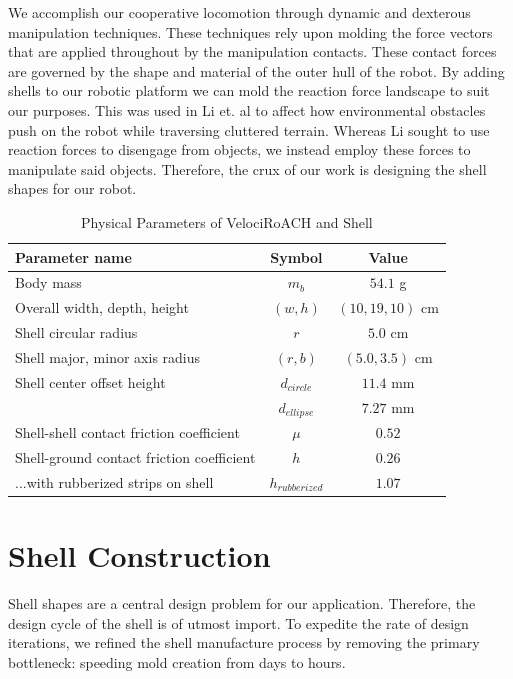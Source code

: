 \documentclass[letterpaper]{report}
\begin{document}
We accomplish our cooperative locomotion through dynamic and dexterous manipulation techniques.
These techniques rely upon molding the force vectors that are applied throughout by the manipulation contacts.
These contact forces are governed by the shape and material of the outer hull of the robot.
By adding shells to our robotic platform we can mold the reaction force landscape to suit our purposes.
This was used in Li et. al \cite{ChenTerradynamic} to affect how environmental obstacles push on the robot while traversing cluttered terrain.
Whereas Li sought to use reaction forces to disengage from objects, we instead employ these forces to manipulate said objects.
Therefore, the crux of our work is designing the shell shapes for our robot.

\begin{table}[tb]
\renewcommand{\arraystretch}{1.1}
\caption{Physical Parameters of VelociRoACH and Shell}
\label{tab:Dimensions1}
\centering
\begin{tabular}{l c c}
\hline
Parameter name & Symbol & Value \\
\hline
Body mass & $m_b$ & $54.1$ g \\
Overall width, depth, height & $(w, h)$ & $(10, 19, 10)$ cm \\
Shell circular radius & $r$ & $5.0$ cm \\
Shell major, minor axis radius & $(r, b)$ & $(5.0, 3.5)$ cm \\
Shell center offset height & $d_{circle}$ & $11.4$ mm \\
                           & $d_{ellipse}$ & $7.27$ mm \\
Shell-shell contact friction coefficient & $\mu$ & $0.52$ \\
Shell-ground contact friction coefficient & $h$ & $0.26$ \\
...with rubberized strips on shell  & $h_{rubberized}$ & $1.07$ \\
\hline
\end{tabular}
\end{table}

\section{Shell Construction}
Shell shapes are a central design problem for our application. Therefore, the design cycle of the shell is of utmost import.
To expedite the rate of design iterations, we refined the shell manufacture process by removing the primary bottleneck: speeding mold creation from days to hours.
\end{document}
